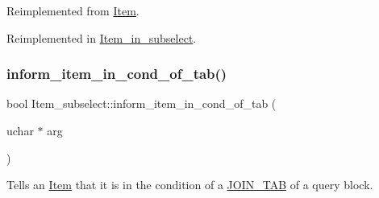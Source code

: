 Reimplemented from \mbox{\hyperlink{classItem_a6e3c38497d210357a4f80a755fb7b61e}{Item}}.



Reimplemented in \mbox{\hyperlink{classItem__in__subselect_aa6c971974969097521a5a736ea6eed02}{Item\+\_\+in\+\_\+subselect}}.

\mbox{\label{classItem__subselect_ace856ad68034af0f86c67a98e4236a22}} 
\subsubsection{\texorpdfstring{inform\+\_\+item\+\_\+in\+\_\+cond\+\_\+of\+\_\+tab()}{inform\_item\_in\_cond\_of\_tab()}}
{\footnotesize\ttfamily bool Item\+\_\+subselect\+::inform\+\_\+item\+\_\+in\+\_\+cond\+\_\+of\+\_\+tab (\begin{DoxyParamCaption}\item[{uchar $\ast$}]{arg }\end{DoxyParamCaption})\hspace{0.3cm}{\ttfamily [virtual]}}

Tells an \mbox{\hyperlink{classItem}{Item}} that it is in the condition of a \mbox{\hyperlink{classJOIN__TAB}{J\+O\+I\+N\+\_\+\+T\+AB}} of a query block.


